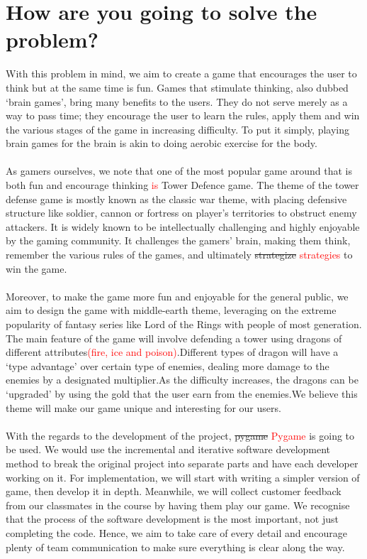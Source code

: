 \documentclass[12pt]{article}
\begin{document}
\section{How are you going to solve the problem?}
With this problem  in mind, we aim to create a game that encourages the user to think but at the same time is fun. Games that stimulate thinking, also dubbed ‘brain games’, bring many benefits to the users. They do not serve merely as a way to pass time; they encourage the user to learn the rules, apply them and win the various stages of the game in increasing difficulty. To put it simply, playing brain games for the brain is akin to doing aerobic exercise for the body.\\\\As gamers ourselves, we note that one of the most popular game around that is both fun and encourage thinking \textcolor{red}{is} Tower Defence game. The theme of the tower defense game is mostly known as the classic war theme, with placing defensive structure like soldier, cannon or fortress on player’s territories to obstruct enemy attackers. It is widely known to be intellectually challenging and highly enjoyable by the gaming community. It challenges the gamers’ brain, making them think, remember the various rules of the games, and ultimately \st{strategize} \textcolor{red}{strategies} to win the game.\\\\Moreover, to make the game more fun and enjoyable for the general public, we aim to design the game with middle-earth theme, leveraging on the extreme popularity of fantasy series like Lord of the Rings with people of most generation. The main feature of the game will involve defending a tower using dragons of different attributes\textcolor{red}{(fire, ice and poison)}.Different types of dragon will have a ‘type advantage’ over certain type of enemies, dealing more damage to the enemies by a designated multiplier.As the difficulty increases, the dragons can be ‘upgraded’ by using the gold that the user earn from the enemies.We believe this theme will make our game unique and interesting for our users.
\\\\With the regards to the development of the project, \st{pygame} \textcolor{red}{Pygame} is going to be used. We would use the incremental and iterative software development method to break the original project into separate parts and have each developer working on it. For implementation, we will start with writing a simpler version of game, then develop it in depth. Meanwhile, we will collect customer feedback from our classmates in the course by having them play our game. We recognise that the process of the software development is the most important, not just completing the code. Hence, we aim to take care of every detail and encourage plenty of team communication to make sure everything is clear along the way.
\end{document}
